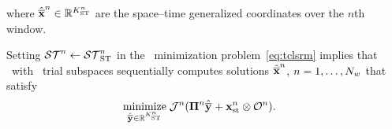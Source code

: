 where $\hat{\mathbf{\overline{x}}}^{n} \in \mathbb{R}^{K_{\text{ST}}^{n}}$ are the space--time generalized coordinates over the $n$th window. 
\begin{comment}
each window, we introduce the space--time trial subspace
$$ \stateArgnt{n} \in \stspaceSTArg{n} \subseteq \RR{N} \otimes \timeSpaceArg{n},$$
along with the space--time trial basis matrix \textit{function}, 
\begin{align*}
\stbasisArgnt{n} &: t \mapsto \stbasis(t) \\
 &: [\timeStartArg{n},\timeEndArg{n}] \rightarrow  \RR{N \times \stdimArg{n}}  ,%
\end{align*}
\KTC{shouldn't be $\equiv$. Look earlier for this. the right hand side should
be on the left with $\defeq$.} with $\Range{\stbasisArgnt{n}} + \stateInterceptSTArg{} \equiv \stspaceSTArg{n} $ and where $\stdimArg{n}$ is the number of space--time generalized coordinates over the $n$th window. 
For simplicity we assume the reference state to be equivalent for each time window, although no such requirement is necessary. 
\KTC{Remove all commas before equations unless it makes sense gramatically.
Add the $n$ superscript to $x_{ref}$}
The state over each window is approximated by,
\begin{equation}\label{eq:stapprox}
 \stateFOMArg{n}{t} \approx \approxstateArg{n}{t}  = \stbasisArg{n}{t} \stgenstateArg{n} + \stateInterceptSTArg{},
\end{equation}

\end{comment}
Setting $\mathcal{ ST }^n \leftarrow \mathcal{ ST }_{\text{ST}}^{n}$ in the
\methodAcronym\ minimization problem~\eqref{eq:tclsrm} implies that
\methodAcronym\ with \spaceTimeAcronym\ trial subspaces sequentially computes
solutions $\hat{\mathbf{\overline{x}}}^{n}$, $n = 1,\ldots,N_w$ that satisfy
\begin{align}\label{eq:obj_gen_slab_spacetime}
\begin{split}
&\underset{\stgenstateyArg{} \in \RR{\stdimArg{n}}}{\text{minimize}}\; \mathcal{J}^n( \stbasisArgnt{n} \stgenstateyArg{} + \stateInterceptSTArg{n} \otimes \onesFunctionArg{n} ).%
\end{split}
\end{align}
